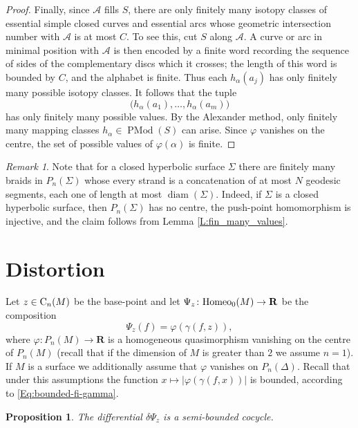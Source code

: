 \documentclass[11pt]{amsart}
\newtheorem{proposition}[subsection]{Proposition}
\theoremstyle{definition}
\theoremstyle{remark}
\newtheorem{remark}[subsection]{Remark}
\numberwithin{equation}{section}
\numberwithin{figure}{section}
\newcommand{\B}[1]{{\mathbf #1}}
\begin{document}
\begin{proof}
Finally, since  \(\mathcal A\) fills \(S\), 
there are only finitely many isotopy classes of essential simple closed curves and essential arcs whose
geometric intersection number with \(\mathcal A\) is at most \(C\). To see
this, cut \(S\) along \(\mathcal A\). A curve or arc in minimal position with
\(\mathcal A\) is then encoded by a finite word recording the sequence of
sides of the complementary discs which it crosses; the length of this word is
bounded by \(C\), and the alphabet is finite. Thus each
\(h_\alpha(a_j)\) has only finitely many possible isotopy classes.
It follows that the tuple 
$$\bigl(h_\alpha(a_1),\ldots,h_\alpha(a_m)\bigr)$$
has only finitely many possible values. By the Alexander method, only finitely
many mapping classes \(h_\alpha\in \operatorname{PMod}(S)\) can arise. 
Since \(\varphi\) vanishes on the centre, the set
of possible values of \(\varphi(\alpha)\) is finite.
\end{proof}

\begin{remark}
Note that for a closed hyperbolic surface $\Sigma$ there are finitely many braids in $P_n(\Sigma)$ whose
every strand is a concatenation of at most $N$ geodesic segments, each one of
length at most $\operatorname{diam}(\Sigma)$. Indeed, if $\Sigma$ is a closed hyperbolic surface, 
then $P_n(\Sigma)$ has no centre, the push-point homomorphism is injective, 
and the claim follows from Lemma \ref{L:fin_many_values}. 
\end{remark}


\section{Distortion}\label{S:distortion}

Let $z\in {\rm C}_n(M)$ be the base-point and let 
$\Psi_z\colon {\rm Homeo}_0(M)\to \B R$ 
be the composition 
$$\Psi_z(f) = \varphi(\gamma(f,z)),$$
where $\varphi\colon P_n(M)\to \B R$ is a homogeneous quasimorphism vanishing on the
centre of $P_n(M)$ (recall that if the dimension of $M$ is greater than $2$ we assume $n=1$). 
If $M$ is a surface we additionally assume that $\varphi$ vanishes on $P_n(\Delta)$. Recall that under this
assumptions the function $x\mapsto|\varphi(\gamma(f,x))|$ is bounded, according to \eqref{Eq:bounded-fi-gamma}.

\begin{proposition}\label{P:semi-bounded-z}
The differential $\delta\Psi_z$ is a semi-bounded cocycle.
\end{proposition}
\end{document}
